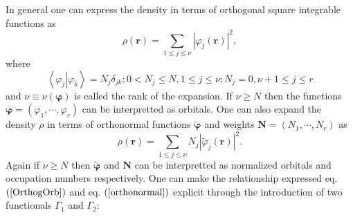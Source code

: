 \documentclass[aps,preprint]{revtex4}%
\begin{document}
In general one can express the density in terms of orthogonal square
integrable functions as
\begin{equation}
\rho\left(  \boldsymbol{r}\right)  =\sum_{1\leq j\leq\nu}\left\vert
\varphi_{j}\left(  \boldsymbol{r}\right)  \right\vert ^{2}, \label{OrthogOrb}%
\end{equation}
where
\begin{equation}
\left\langle \left.  \varphi_{j}\right\vert \varphi_{k}\right\rangle
=N_{j}\delta_{jk};0<N_{j}\leq N,1\leq j\leq\nu;N_{j}=0,\nu+1\leq j\leq r
\end{equation}
and $\nu\equiv\nu\left(  \boldsymbol{\varphi}\right)  $ is called the rank of
the expansion. If $\nu\geq N$ then the functions $\boldsymbol{\varphi}=\left(
\varphi_{1},\cdots,\varphi_{r}\right)  $ can be interpretted as orbitals. One
can also expand the density $\rho$ in terms of orthonormal functions
$\boldsymbol{\tilde{\varphi}}$ and weights $\boldsymbol{N}=\left(
N_{1},\cdots,N_{r}\right)  $ as
\begin{equation}
\rho\left(  \boldsymbol{r}\right)  =\sum_{1\leq j\leq\nu}N_{j}\left\vert
\tilde{\varphi}_{j}\left(  \boldsymbol{r}\right)  \right\vert ^{2}.
\label{orthonormal}%
\end{equation}
Again if $\nu\geq N$ then $\boldsymbol{\tilde{\varphi}}$ and $\boldsymbol{N}$
can be interpretted as normalized orbitals and occupation numbers
respectively. One can make the relationship expressed eq. $\left(
\ref{OrthogOrb}\right)  $ and eq. $\left(  \ref{orthonormal}\right)  $
explicit through the introduction of two functionals $\Gamma_{1}$ and
$\Gamma_{2}:$
\end{document}
